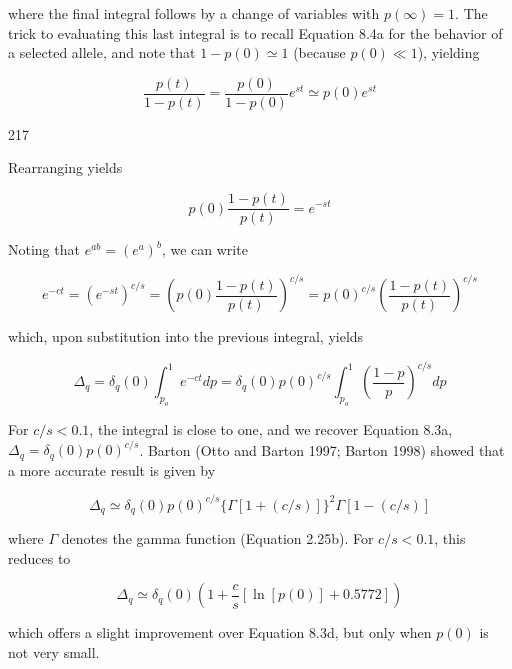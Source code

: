 \documentclass{article}
\begin{document}
where the final integral follows by a change of variables with  $ p(\infty) = 1 $. The trick to evaluating this last integral is to recall Equation 8.4a for the behavior of a selected allele, and note that  $ 1 - p(0) \simeq 1 $ (because  $ p(0) \ll 1 $), yielding

\begin{equation}
\frac{p(t)}{1-p(t)}=\frac{p(0)}{1-p(0)}e^{s t}\simeq p(0)e^{s t}
\end{equation}

217

Rearranging yields

\begin{equation}
p(0)\frac{1-p(t)}{p(t)}=e^{-st}
\end{equation}

Noting that  $ e^{ab} = (e^{a})^{b} $, we can write

\begin{equation}
e^{-c t}=\left(e^{-s t}\right)^{c/s}=\left(p(0)\frac{1-p(t)}{p(t)}\right)^{c/s}=p(0)^{c/s}\left(\frac{1-p(t)}{p(t)}\right)^{c/s}
\end{equation}

which, upon substitution into the previous integral, yields

\begin{equation}
\Delta_{q}=\delta_{q}(0)\int_{p_{o}}^{1}e^{-c t}d p=\delta_{q}(0)p(0)^{c/s}\int_{p_{o}}^{1}\left(\frac{1-p}{p}\right)^{c/s}d p
\end{equation}

For $c/s < 0.1$, the integral is close to one, and we recover Equation 8.3a, $\Delta_q = \delta_q(0) p(0)^{c/s}$. Barton (Otto and Barton 1997; Barton 1998) showed that a more accurate result is given by

\begin{equation}
\Delta_{q}\simeq\delta_{q}(0)p(0)^{c/s}\{\Gamma\left[1+(c/s)\right]\}^{2}\Gamma\left[1-(c/s)\right]
\tag{8.5a}
\label{eq:8_5a}
\end{equation}

where  $ \Gamma $ denotes the gamma function (Equation 2.25b). For  $ c/s < 0.1 $, this reduces to

\begin{equation}
\Delta_{q}\simeq\delta_{q}(0)\left(1+\frac{c}{s}\left[\ln[p(0)]+0.5772\right]\right)
\tag{8.5b}
\label{eq:8_5b}
\end{equation}

which offers a slight improvement over Equation 8.3d, but only when  $ p(0) $ is not very small.
\end{document}
